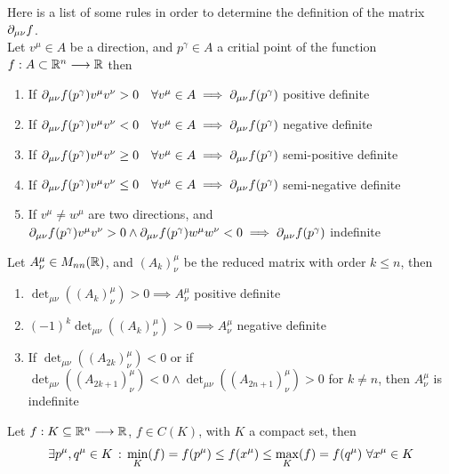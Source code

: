 \documentclass[../complete.tex]{subfiles}
\begin{document}
\begin{thm}
	Here is a list of some rules in order to determine the definition of the matrix $\partial_{\mu\nu}f$.\\
	Let $v^\mu\in A$ be a direction, and $p^\gamma\in A$ a critial point of the function $f:A\subset\mathbb{R}^n\overset{}{\longrightarrow}\mathbb{R}$ then
	\begin{enumerate}
	\item If $\partial_{\mu\nu}f(p^\gamma)v^\mu v^\nu>0\quad\forall v^\mu\in A\implies{}\partial_{\mu\nu}f(p^\gamma)$ positive definite
	\item If $\partial_{\mu\nu}f(p^\gamma)v^\mu v^\nu<0\quad\forall v^\mu\in A\implies{}\partial_{\mu\nu}f(p^\gamma)$ negative definite
	\item If $\partial_{\mu\nu}f(p^\gamma)v^\mu v^\nu\ge0\quad\forall v^\mu\in A\implies{}\partial_{\mu\nu}f(p^\gamma)$ semi-positive definite
	\item If $\partial_{\mu\nu}f(p^\gamma)v^\mu v^\nu\le0\quad\forall v^\mu\in A\implies{}\partial_{\mu\nu}f(p^\gamma)$ semi-negative definite
	\item If $v^\mu\ne w^\mu$ are two directions, and $\partial_{\mu\nu}f(p^\gamma)v^\mu v^\nu>0\wedge\partial_{\mu\nu}f(p^\gamma)w^\mu w^\nu<0\implies{}\partial_{\mu\nu}f(p^\gamma)$ indefinite
	\end{enumerate}
\end{thm}
\begin{thm}
	Let $A^\mu_\nu\in M_{nn}(\mathbb{R})$, and $(A_k)^\mu_\nu$ be the reduced matrix with order $k\le n$, then
	\begin{enumerate}
	\item $\det_{\mu\nu}\left( (A_k)^\mu_\nu \right)>0\implies{} A^\mu_\nu$ positive definite
	\item $(-1)^k\det_{\mu\nu}\left( (A_k)^\mu_\nu \right)>0\implies{} A^\mu_\nu$ negative definite
	\item If $\det_{\mu\nu}\left( (A_{2k})^\mu_\nu \right)<0$ or if $\det_{\mu\nu}\left( (A_{2k+1})^\mu_\nu \right)<0\wedge\det_{\mu\nu}\left( (A_{2n+1})^\mu_\nu \right)>0$ for $k\ne n$, then $A^\mu_\nu$ is indefinite
	\end{enumerate}
\end{thm}
\begin{thm}
	Let $f:K\subseteq\mathbb{R}^n\overset{}{\longrightarrow}\mathbb{R}$, $f\in C(K)$, with $K$ a compact set, then
	\begin{equation}
		\exists p^\mu,q^\mu\in K\, :\, \min_K(f)=f(p^\mu)\le f(x^\mu)\le\max_K(f)=f(q^\mu)\ \forall x^\mu\in K
		\label{eq:weierstrass}
	\end{equation}
\end{thm}
\end{document}
